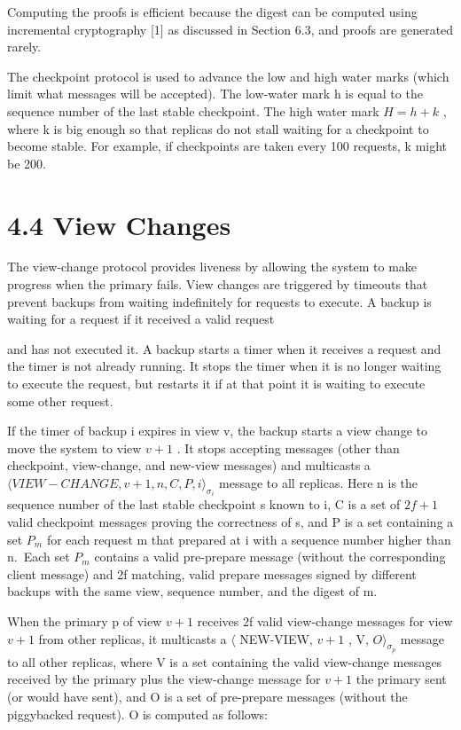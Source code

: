 \documentclass[
]{article}
\begin{document}
Computing the proofs is efficient because the digest can be computed
using incremental cryptography {[}1{]} as discussed in Section 6.3, and
proofs are generated rarely.

The checkpoint protocol is used to advance the low and high water marks
(which limit what messages will be accepted). The low-water mark h is
equal to the sequence number of the last stable checkpoint. The high
water mark \(H = h + k\) , where k is big enough so that replicas do not
stall waiting for a checkpoint to become stable. For example, if
checkpoints are taken every 100 requests, k might be 200.

\section{4.4 View Changes}\label{view-changes}

The view-change protocol provides liveness by allowing the system to
make progress when the primary fails. View changes are triggered by
timeouts that prevent backups from waiting indefinitely for requests to
execute. A backup is waiting for a request if it received a valid
request

and has not executed it. A backup starts a timer when it receives a
request and the timer is not already running. It stops the timer when it
is no longer waiting to execute the request, but restarts it if at that
point it is waiting to execute some other request.

If the timer of backup i expires in view v, the backup starts a view
change to move the system to view \(v + 1\) . It stops accepting
messages (other than checkpoint, view-change, and new-view messages) and
multicasts a
\(\langle VIEW-CHANGE, v + 1, n, C, P, i \rangle_{\sigma_i}\) message to
all replicas. Here n is the sequence number of the last stable
checkpoint s known to i, C is a set of \(2f + 1\) valid checkpoint
messages proving the correctness of s, and P is a set containing a set
\(P_m\) for each request m that prepared at i with a sequence number
higher than n.~Each set \(P_m\) contains a valid pre-prepare message
(without the corresponding client message) and 2f matching, valid
prepare messages signed by different backups with the same view,
sequence number, and the digest of m.

When the primary p of view \(v + 1\) receives 2f valid view-change
messages for view \(v + 1\) from other replicas, it multicasts a
\(\langle\) NEW-VIEW, \(v + 1\) , V, \(O\rangle_{\sigma_{p}}\) message
to all other replicas, where V is a set containing the valid view-change
messages received by the primary plus the view-change message for
\(v + 1\) the primary sent (or would have sent), and O is a set of
pre-prepare messages (without the piggybacked request). O is computed as
follows:
\end{document}
